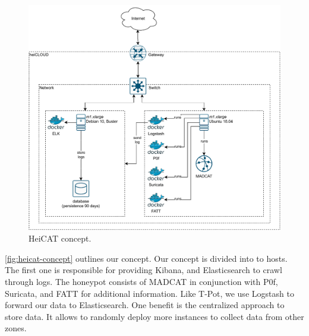 \begin{figure}[ht]
    \centering
    \includegraphics[width=\textwidth]{figures/heicat-conecpt.pdf}
    \caption[HeiCAT concept]{HeiCAT concept.}
    \label{fig:heicat-concept}
\end{figure}

\autoref{fig:heicat-concept} outlines our concept. %
Our concept is divided into to hosts.
The first one is responsible for providing Kibana, and Elasticsearch to crawl through logs.
The honeypot consists of MADCAT in conjunction with P0f, Suricata, and FATT for additional information.
Like T-Pot, we use Logstash to forward our data to Elasticsearch.
One benefit is the centralized approach to store data.
It allows to randomly deploy more instances to collect data from other zones.

